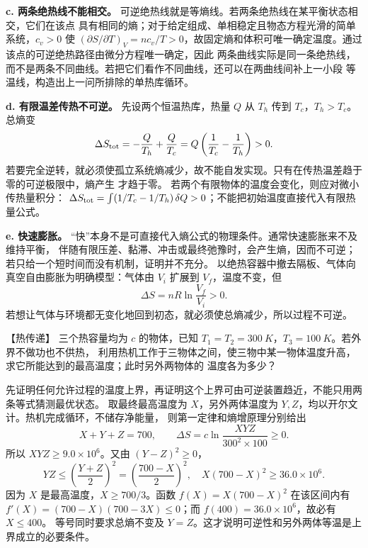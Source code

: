 {\begin{xesolution}
\textbf{c. 两条绝热线不能相交。} 可逆绝热线就是等熵线。若两条绝热线在某平衡状态相交，它们在该点
具有相同的熵；对于给定组成、单相稳定且物态方程光滑的简单系统，$c_v>0$ 使
$(\partial S/\partial T)_V=nc_v/T>0$，故固定熵和体积可唯一确定温度。通过该点的可逆绝热路径由微分方程唯一确定，因此
两条曲线实际是同一条绝热线，而不是两条不同曲线。若把它们看作不同曲线，还可以在两曲线间补上一小段
等温线，构造出上一问所排除的单热库循环。

\textbf{d. 有限温差传热不可逆。} 先设两个恒温热库，热量 $Q$ 从 $T_h$ 传到 $T_c$，$T_h>T_c$。总熵变
\[
  \Delta S_{\rm tot}
  =-\frac{Q}{T_h}+\frac{Q}{T_c}
  =Q\left(\frac1{T_c}-\frac1{T_h}\right)>0.
\]
若要完全逆转，就必须使孤立系统熵减少，故不能自发实现。只有在传热温差趋于零的可逆极限中，熵产生
才趋于零。
若两个有限物体的温度会变化，则应对微小传热量积分：
$\Delta S_{\rm tot}=\int(1/T_c-1/T_h)\,\delta Q>0$；不能把初始温度直接代入有限热量公式。

\textbf{e. 快速膨胀。} “快”本身不是可直接代入熵公式的物理条件。通常快速膨胀来不及维持平衡，
伴随有限压差、黏滞、冲击或最终弛豫时，会产生熵，因而不可逆；若只给一个短时间而没有机制，证明并不充分。
以绝热容器中撤去隔板、气体向真空自由膨胀为明确模型：气体由 $V_i$ 扩展到 $V_f$，温度不变，但
\[
  \Delta S=nR\ln\frac{V_f}{V_i}>0.
\]
若想让气体与环境都无变化地回到初态，就必须使总熵减少，所以过程不可逆。

\end{xesolution}


\begin{origexamplebox}{【热传递】}\label{ch16:ex:s30-21-4}
三个热容量均为 $c$ 的物体，已知 $T_1=T_2=\SI{300}{K}$，$T_3=\SI{100}{K}$。若外界不做功也不供热，
利用热机工作于三物体之间，使三物中某一物体温度升高，求它所能达到的最高温度；此时另外两物体的
温度各为多少？

\ThQThreeBodies
\end{origexamplebox}\par\nopagebreak[4]

\par\nopagebreak[4]\begin{xesolution}
先证明任何允许过程的温度上界，再证明这个上界可由可逆装置趋近，不能只用两条等式猜测最优状态。
取最终最高温度为 $X$，另外两体温度为 $Y,Z$，均以开尔文计。热机完成循环，不储存净能量，
则第一定律和熵增原理分别给出
\[
 X+Y+Z=700,\qquad
 \Delta S=c\ln\frac{XYZ}{300^2\times100}\ge0.
\]
所以 $XYZ\ge9.0\times10^6$。又由 $(Y-Z)^2\ge0$，
\[
 YZ\le\left(\frac{Y+Z}{2}\right)^2=\left(\frac{700-X}{2}\right)^2,
 \quad X(700-X)^2\ge36.0\times10^6.
\]
因为 $X$ 是最高温度，$X\ge700/3$。函数 $f(X)=X(700-X)^2$ 在该区间内有
$f'(X)=(700-X)(700-3X)\le0$；而 $f(400)=36.0\times10^6$，故必有 $X\le400$。
等号同时要求总熵不变及 $Y=Z$。这才说明可逆性和另外两体等温是上界成立的必要条件。


\end{xesolution}}
